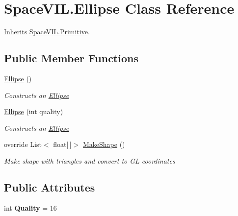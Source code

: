 \hypertarget{class_space_v_i_l_1_1_ellipse}{}\section{Space\+V\+I\+L.\+Ellipse Class Reference}
\label{class_space_v_i_l_1_1_ellipse}


Inherits \mbox{\hyperlink{class_space_v_i_l_1_1_primitive}{Space\+V\+I\+L.\+Primitive}}.

\subsection*{Public Member Functions}
\begin{DoxyCompactItemize}
\item 
\mbox{\hyperlink{class_space_v_i_l_1_1_ellipse_a33ed4c5c8bbdb3a3fe9001292dc7b58e}{Ellipse}} ()
\begin{DoxyCompactList}\small\item\em Constructs an \mbox{\hyperlink{class_space_v_i_l_1_1_ellipse}{Ellipse}} \end{DoxyCompactList}\item 
\mbox{\hyperlink{class_space_v_i_l_1_1_ellipse_a972b5c63aba04b84274f5048351a851a}{Ellipse}} (int quality)
\begin{DoxyCompactList}\small\item\em Constructs an \mbox{\hyperlink{class_space_v_i_l_1_1_ellipse}{Ellipse}} \end{DoxyCompactList}\item 
override List$<$ float\mbox{[}$\,$\mbox{]}$>$ \mbox{\hyperlink{class_space_v_i_l_1_1_ellipse_aa2311fd87e9a988eca0d754ad6e9093d}{Make\+Shape}} ()
\begin{DoxyCompactList}\small\item\em Make shape with triangles and convert to GL coordinates \end{DoxyCompactList}\end{DoxyCompactItemize}
\subsection*{Public Attributes}
\begin{DoxyCompactItemize}
\item 
\mbox{\label{class_space_v_i_l_1_1_ellipse_acd5d2d2d328d5463759a1f8528d7640b}} 
int {\bfseries Quality} = 16
\end{DoxyCompactItemize}
